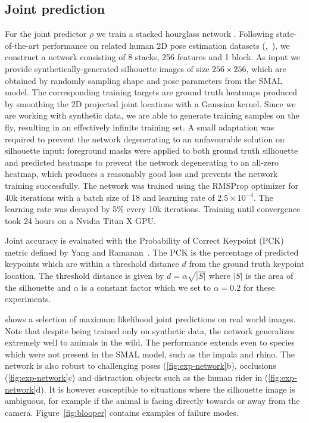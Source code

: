   \subsection{Joint prediction}
  \label{sec:exp-network}
  For the joint predictor $\rho$ we train a stacked hourglass network \cite{newell2016stacked}. Following state-of-the-art performance on related human 2D pose estimation datasets (\cite{andriluka14cvpr},~\cite{mscoco}), we construct a network consisting of 8 stacks, 256 features and 1 block. As input we provide synthetically-generated silhouette images of size $256\times 256$, which are obtained by randomly sampling shape and pose parameters from the SMAL model. The corresponding training targets are ground truth heatmaps produced by smoothing the 2D projected joint locations with a Gaussian kernel. Since we are working with synthetic data, we are able to generate training samples on the fly, resulting in an effectively infinite training set. A small adaptation was required to prevent the network degenerating to an unfavourable solution on silhouette input: foreground masks were applied to both ground truth silhouette and predicted heatmaps to prevent the network degenerating to an all-zero heatmap, which produces a reasonably good loss and prevents the network training successfully. The network was trained using the RMSProp optimizer for 40k iterations with a batch size of 18 and learning rate of $2.5\times 10^{-4}$. The learning rate was decayed by 5\% every 10k iterations. Training until convergence took 24 hours on a Nvidia Titan X GPU.
  
  Joint accuracy is evaluated with the Probability of Correct Keypoint (PCK) metric defined by Yang and Ramanan~\cite{yang2013articulated}. The PCK is the percentage of predicted keypoints which are within a threshold distance $d$ from the ground truth keypoint location. The threshold distance is given by $d=\alpha\sqrt{|S|}$ where $|S|$ is the area of the silhouette and $\alpha$ is a constant factor which we set to $\alpha=0.2$ for these experiments.
  
   shows a selection of maximum likelihood joint predictions on real world images. Note that despite being trained only on synthetic data, the network generalizes extremely well to animals in the wild. The performance extends even to species which were not present in the SMAL model, such as the impala and rhino. The network is also robust to challenging poses (\ref{fig:exp-network}b), occlusions (\ref{fig:exp-network}c) and distraction objects such as the human rider in (\ref{fig:exp-network}d). It is however susceptible to situations where the silhouette image is ambiguous, for example if the animal is facing directly towards or away from the camera. Figure~\ref{fig:blooper} contains examples of failure modes.
  
